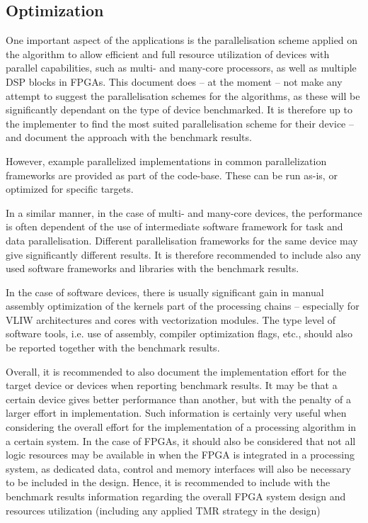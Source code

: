 \subsection{Optimization}
One important aspect of the applications is the parallelisation scheme applied on the algorithm to allow efficient and full resource utilization of devices with parallel capabilities, such as multi- and many-core processors, as well as multiple DSP blocks in FPGAs. This document does – at the moment – not make any attempt to suggest the parallelisation schemes for the algorithms, as these will be significantly dependant on the type of device benchmarked. It is therefore up to the implementer to find the most suited parallelisation scheme for their device – and document the approach with the benchmark results. 

However, example parallelized implementations in common parallelization frameworks are provided as part of the code-base. These can be run as-is, or optimized for specific targets.

In a similar manner, in the case of multi- and many-core devices, the performance is often dependent of the use of intermediate software framework for task and data parallelisation. Different parallelisation frameworks for the same device may give significantly different results. It is therefore recommended to include also any used software frameworks and libraries with the benchmark results.

In the case of software devices, there is usually significant gain in manual assembly optimization of the kernels part of the processing chains – especially for VLIW architectures and cores with vectorization modules. The type level of software tools, i.e. use of assembly, compiler optimization flags, etc., should also be reported together with the benchmark results.

Overall, it is recommended to also document the implementation effort for the target device or devices when reporting benchmark results. It may be that a certain device gives better performance than another, but with the penalty of a larger effort in implementation. Such information is certainly very useful when considering the overall effort for the implementation of a processing algorithm in a certain system. 
In the case of FPGAs, it should also be considered that not all logic resources may be available in when the FPGA is integrated in a processing system, as dedicated data, control and memory interfaces will also be necessary to be included in the design. Hence, it is recommended to include with the benchmark results information regarding the overall FPGA system design and resources utilization (including any applied TMR strategy in the design)

